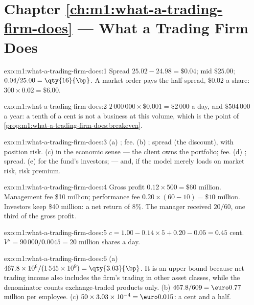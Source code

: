 \section*{Chapter \ref{ch:m1:what-a-trading-firm-does} --- What a Trading Firm Does}

\begin{solution}{exo:m1:what-a-trading-firm-does:1}
Spread $25.02 - 24.98 = \$0.04$; mid $\$25.00$; $0.04/25.00 = \qty{16}{\bp}$.
A market order pays the half-spread, $\$0.02$ a share: $300 \times 0.02 =
\$6.00$.
\end{solution}

\begin{solution}{exo:m1:what-a-trading-firm-does:2}
$2\,000\,000 \times \$0.001 = \$2\,000$ a day, and $\$504\,000$ a year: a
tenth of a cent is not a business at this volume, which is the point of
\cref{prop:m1:what-a-trading-firm-does:breakeven}.
\end{solution}

\begin{solution}{exo:m1:what-a-trading-firm-does:3}
(a) ; fee. (b) ; spread (the discount), with position risk.
(c)  in the economic sense --- the client owns the portfolio; fee.
(d) ; spread. (e)  for the fund's investors;  --- and,
if the model merely loads on market risk, risk premium.
\end{solution}

\begin{solution}{exo:m1:what-a-trading-firm-does:4}
Gross profit $0.12 \times 500 = \$60$ million. Management fee \$10 million;
performance fee $0.20 \times (60 - 10) = \$10$ million. Investors keep \$40
million: a net return of 8\%. The manager received $20/60$, one third of the
gross profit.
\end{solution}

\begin{solution}{exo:m1:what-a-trading-firm-does:5}
$c = 1.00 - 0.14 \times 5 + 0.20 - 0.05 = 0.45$ cent. $V^\star = 90\,000 /
0.0045 = 20$ million shares a day.
\end{solution}

\begin{solution}{exo:m1:what-a-trading-firm-does:6}
(a) $467.8 \times 10^6 / (1\,545 \times 10^9) = \qty{3.03}{\bp}$. It is an
upper bound because net trading income also includes the firm's trading in
other asset classes, while the denominator counts exchange-traded products
only. (b) $467.8/609 = \text{\euro}0.77$ million per employee. (c)
$50 \times 3.03 \times 10^{-4} = \text{\euro}0.015$: a cent and a half.
\end{solution}

